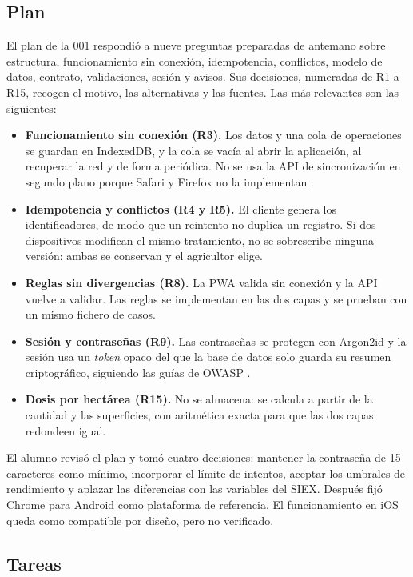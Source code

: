 \subsection{Plan}\label{subsec:Plan001}

El plan de la 001 respondió a nueve preguntas preparadas de antemano sobre estructura, funcionamiento sin conexión, idempotencia, conflictos, modelo de datos, contrato, validaciones, sesión y avisos. Sus decisiones, numeradas de R1 a R15, recogen el motivo, las alternativas y las fuentes. Las más relevantes son las siguientes:

\begin{itemize}
	\item \textbf{Funcionamiento sin conexión (R3).} Los datos y una cola de operaciones se guardan en IndexedDB, y la cola se vacía al abrir la aplicación, al recuperar la red y de forma periódica. No se usa la API de sincronización en segundo plano porque Safari y Firefox no la implementan \citep{caniuse-background-sync}.
	\item \textbf{Idempotencia y conflictos (R4 y R5).} El cliente genera los identificadores, de modo que un reintento no duplica un registro. Si dos dispositivos modifican el mismo tratamiento, no se sobrescribe ninguna versión: ambas se conservan y el agricultor elige.
	\item \textbf{Reglas sin divergencias (R8).} La PWA valida sin conexión y la API vuelve a validar. Las reglas se implementan en las dos capas y se prueban con un mismo fichero de casos.
	\item \textbf{Sesión y contraseñas (R9).} Las contraseñas se protegen con Argon2id y la sesión usa un \emph{token} opaco del que la base de datos solo guarda su resumen criptográfico, siguiendo las guías de OWASP \citep{owasp-password-storage,owasp-session}.
	\item \textbf{Dosis por hectárea (R15).} No se almacena: se calcula a partir de la cantidad y las superficies, con aritmética exacta para que las dos capas redondeen igual.
\end{itemize}

El alumno revisó el plan y tomó cuatro decisiones: mantener la contraseña de 15 caracteres como mínimo, incorporar el límite de intentos, aceptar los umbrales de rendimiento y aplazar las diferencias con las variables del SIEX. Después fijó Chrome para Android como plataforma de referencia. El funcionamiento en iOS queda como compatible por diseño, pero no verificado.

\subsection{Tareas}\label{subsec:Tareas001}

